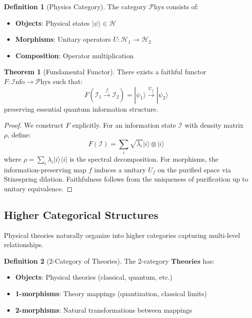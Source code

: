 \documentclass[11pt,a4paper]{article}
\theoremstyle{definition}
\newtheorem{definition}{Definition}[section]
\newtheorem{theorem}{Theorem}[section]
\newcommand{\Info}{\mathcal{I}\text{nfo}}
\newcommand{\Phys}{\mathcal{P}\text{hys}}
\newcommand{\Hil}{\mathcal{H}}
\begin{document}
\begin{definition}[Physics Category]
The category $\Phys$ consists of:
\begin{itemize}
\item \textbf{Objects}: Physical states $|\psi\rangle \in \Hil$
\item \textbf{Morphisms}: Unitary operators $U: \Hil_1 \to \Hil_2$
\item \textbf{Composition}: Operator multiplication
\end{itemize}
\end{definition}

\begin{theorem}[Fundamental Functor]
There exists a faithful functor $F: \Info \to \Phys$ such that:
\begin{equation}
F(\mathcal{I}_1 \xrightarrow{f} \mathcal{I}_2) = |\psi_1\rangle \xrightarrow{U_f} |\psi_2\rangle
\end{equation}
preserving essential quantum information structure.
\end{theorem}

\begin{proof}
We construct $F$ explicitly. For an information state $\mathcal{I}$ with density matrix $\rho$, define:
\[F(\mathcal{I}) = \sum_i \sqrt{\lambda_i}|i\rangle \otimes |i\rangle\]
where $\rho = \sum_i \lambda_i |i\rangle\langle i|$ is the spectral decomposition. For morphisms, the information-preserving map $f$ induces a unitary $U_f$ on the purified space via Stinespring dilation. Faithfulness follows from the uniqueness of purification up to unitary equivalence.
\end{proof}

\subsection{Higher Categorical Structures}

Physical theories naturally organize into higher categories capturing multi-level relationships.

\begin{definition}[2-Category of Theories]
The 2-category $\mathbf{Theories}$ has:
\begin{itemize}
\item \textbf{Objects}: Physical theories (classical, quantum, etc.)
\item \textbf{1-morphisms}: Theory mappings (quantization, classical limits)
\item \textbf{2-morphisms}: Natural transformations between mappings
\end{itemize}
\end{definition}
\end{document}
